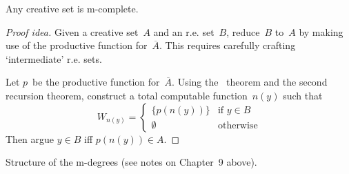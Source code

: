 \begin{thm}[Myhill]
Any creative set is m-complete.
\end{thm}
\begin{proof}[Proof idea]
Given a creative set~\(A\) and an r.e. set~\(B\), reduce~\(B\) to~\(A\) by making use of the productive function for~\(\overline{A}\). This requires carefully crafting `intermediate' r.e. sets.

Let \(p\)~be the productive function for~\(\overline{A}\). Using the \smn\ theorem and the second recursion theorem, construct a total computable function~\(n(y)\) such that
\[W_{n(y)}=\begin{cases}
\{p(n(y))\}&\text{if }y\in B\\
\emptyset&\text{otherwise}
\end{cases}\]
Then argue \(y\in B\) iff \(p(n(y))\in A\).
\end{proof}
\begin{app}
Structure of the m-degrees (see notes on Chapter~9 above).
\end{app}
